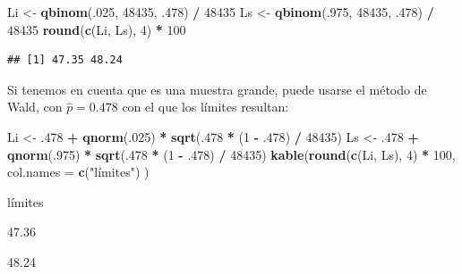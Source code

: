 \documentclass[]{book}
\newenvironment{Shaded}{\begin{snugshade}}{\end{snugshade}}
\newcommand{\DataTypeTok}[1]{\textcolor[rgb]{0.13,0.29,0.53}{#1}}
\newcommand{\DecValTok}[1]{\textcolor[rgb]{0.00,0.00,0.81}{#1}}
\newcommand{\FloatTok}[1]{\textcolor[rgb]{0.00,0.00,0.81}{#1}}
\newcommand{\KeywordTok}[1]{\textcolor[rgb]{0.13,0.29,0.53}{\textbf{#1}}}
\newcommand{\NormalTok}[1]{#1}
\newcommand{\OperatorTok}[1]{\textcolor[rgb]{0.81,0.36,0.00}{\textbf{#1}}}
\newcommand{\StringTok}[1]{\textcolor[rgb]{0.31,0.60,0.02}{#1}}
\begin{document}
\begin{Shaded}
\begin{Highlighting}[]
\NormalTok{Li <-}\StringTok{ }\KeywordTok{qbinom}\NormalTok{(.}\DecValTok{025}\NormalTok{, }\DecValTok{48435}\NormalTok{, }\FloatTok{.478}\NormalTok{) }\OperatorTok{/}\StringTok{ }\DecValTok{48435}
\NormalTok{Ls <-}\StringTok{ }\KeywordTok{qbinom}\NormalTok{(.}\DecValTok{975}\NormalTok{, }\DecValTok{48435}\NormalTok{, }\FloatTok{.478}\NormalTok{) }\OperatorTok{/}\StringTok{ }\DecValTok{48435}
\KeywordTok{round}\NormalTok{(}\KeywordTok{c}\NormalTok{(Li, Ls), }\DecValTok{4}\NormalTok{) }\OperatorTok{*}\StringTok{ }\DecValTok{100}
\end{Highlighting}
\end{Shaded}

\begin{verbatim}
## [1] 47.35 48.24
\end{verbatim}

Si tenemos en cuenta que es una muestra grande, puede usarse el método de Wald, con \(\widehat{p}=0.478\) con el que los límites resultan:

\begin{Shaded}
\begin{Highlighting}[]
\NormalTok{Li <-}\StringTok{ }\FloatTok{.478} \OperatorTok{+}\StringTok{ }\KeywordTok{qnorm}\NormalTok{(.}\DecValTok{025}\NormalTok{) }\OperatorTok{*}\StringTok{ }\KeywordTok{sqrt}\NormalTok{(.}\DecValTok{478} \OperatorTok{*}\StringTok{ }\NormalTok{(}\DecValTok{1} \OperatorTok{-}\StringTok{ }\FloatTok{.478}\NormalTok{) }\OperatorTok{/}
\StringTok{  }\DecValTok{48435}\NormalTok{)}
\NormalTok{Ls <-}\StringTok{ }\FloatTok{.478} \OperatorTok{+}\StringTok{ }\KeywordTok{qnorm}\NormalTok{(.}\DecValTok{975}\NormalTok{) }\OperatorTok{*}\StringTok{ }\KeywordTok{sqrt}\NormalTok{(.}\DecValTok{478} \OperatorTok{*}\StringTok{ }\NormalTok{(}\DecValTok{1} \OperatorTok{-}\StringTok{ }\FloatTok{.478}\NormalTok{) }\OperatorTok{/}
\StringTok{  }\DecValTok{48435}\NormalTok{)}
\KeywordTok{kable}\NormalTok{(}\KeywordTok{round}\NormalTok{(}\KeywordTok{c}\NormalTok{(Li, Ls), }\DecValTok{4}\NormalTok{) }\OperatorTok{*}\StringTok{ }\DecValTok{100}\NormalTok{,}
  \DataTypeTok{col.names =} \KeywordTok{c}\NormalTok{(}\StringTok{"límites"}\NormalTok{)}
\NormalTok{)}
\end{Highlighting}
\end{Shaded}

límites

47.36

48.24
\end{document}
